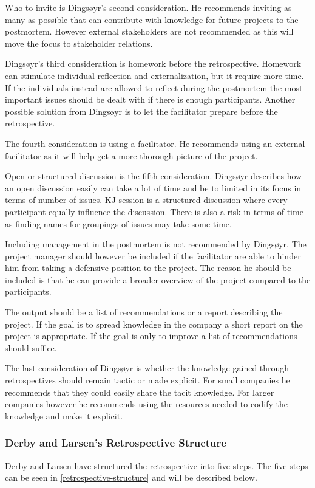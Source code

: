 Who to invite is Dingsøyr's second consideration. He recommends inviting as many as possible that can contribute with knowledge for future projects to the postmortem. However external stakeholders are not recommended as this will move the focus to stakeholder relations. 

Dingsøyr's third consideration is homework before the retrospective. Homework can stimulate individual reflection and externalization, but it require more time. If the individuals instead are allowed to reflect during the postmortem the most important issues should be dealt with if there is enough participants. Another possible solution from Dingsøyr is to let the facilitator prepare before the retrospective. 

The fourth consideration is using a facilitator. He recommends using an external facilitator as it will help get a more thorough picture of the project.

Open or structured discussion is the fifth consideration. Dingsøyr describes how an open discussion easily can take a lot of time and be to limited in its focus in terms of number of issues. KJ-session is a structured discussion where every participant equally influence the discussion. There is also a risk in terms of time as finding names for groupings of issues may take some time. 

Including management in the postmortem is not recommended by Dingsøyr. The project manager should however be included if the facilitator are able to hinder him from taking a defensive position to the project. The reason he should be included is that he can provide a broader overview of the project compared to the participants. 

The output should be a list of recommendations or a report describing the project. If the goal is to spread knowledge in the company a short report on the project is appropriate. If the goal is only to improve a list of recommendations should suffice. 

The last consideration of Dingsøyr is whether the knowledge gained through retrospectives should remain tactic or made explicit. For small companies he recommends that they could easily share the tacit knowledge. For larger companies however he recommends using the resources needed to codify the knowledge and make it explicit. 

\subsubsection{Derby and Larsen's Retrospective Structure}
Derby and Larsen \cite{Larsen2006} have structured the retrospective into five steps. The five steps can be seen in \autoref{retrospective-structure} and will be described below. 

